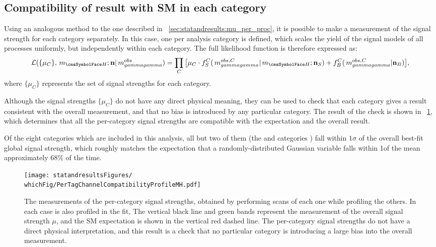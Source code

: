 \subsection{Compatibility of result with SM in each category}

Using an analogous method to the one described in \Sec~\ref{sec:statandresults:mu_per_proc}, it is possible to make a measurement of the signal strength for each category separately. In this case, one \POI per analysis category is defined, which scales the yield of the signal models of all processes uniformly, but independently within each category. The full likelihood function is therefore expressed as:
\begin{equation}
\label{eq:statandresults:likelihood_function}
\mathcal{L}(\{\mu_C\}, \mH; \mathbf{n} | \mgg^{obs} ) = \prod_C \big[\mu_C \cdot f^C_S(\mgg^{obs,C} |\mH; \mathbf{n}_S) + f^C_B(\mgg^{obs,C} | \mathbf{n}_B )\big], 
\end{equation}
where $\{\mu_C\}$ represents the set of signal strengths for each category.

Although the signal strengths $\{\mu_C\}$ do not have any direct physical meaning, they can be used to check that each category gives a result consistent with the overall measurement, and that no bias is introduced by any particular category. The result of the check is shown in \Fig~\ref{fig:statandresults:mu_per_tag}, which determines that all the per-category signal strengths are compatible with the \SM expectation and the overall result.%

Of the eight categories which are included in this analysis, all but two of them (the  and  categories ) fall within $1\sigma$ of the overall best-fit global signal strength, which roughly matches the expectation that a randomly-distributed Gaussian variable falls within 1\sigma of the mean approximately 68\% of the time.

\begin{figure}[ht!]
\centering
\texttt{[image: statandresultsFigures/\\whichFig/PerTagChannelCompatibilityProfileMH.pdf]} 
\caption{The measurements of the per-category signal strengths, obtained by performing \DNLL scans of each one while profiling the others. In each case \mH is also profiled in the fit, The vertical black line and green bands represent the measurement of the overall signal strength $\mu$, and the SM expectation is shown in the vertical red dashed line. The per-category signal strengths do not have a direct physical interpretation, and this result is a check that no particular category is introducing a large bias into the overall measurement.}

\label{fig:statandresults:mu_per_tag}

\end{figure}

